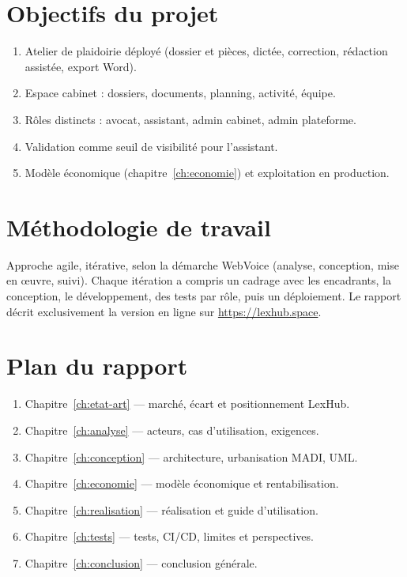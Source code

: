 \section{Objectifs du projet}

\begin{enumerate}[label=\textbf{O\arabic*.}]
  \item Atelier de plaidoirie déployé (dossier et pièces, dictée, correction, rédaction assistée, export Word).
  \item Espace cabinet : dossiers, documents, planning, activité, équipe.
  \item Rôles distincts : avocat, assistant, admin cabinet, admin plateforme.
  \item Validation comme seuil de visibilité pour l'assistant.
  \item Modèle économique (chapitre~\ref{ch:economie}) et exploitation en production.
\end{enumerate}

\section{Méthodologie de travail}

Approche agile, itérative, selon la démarche WebVoice (analyse, conception, mise en œuvre, suivi). Chaque itération a compris un cadrage avec les encadrants, la conception, le développement, des tests par rôle, puis un déploiement. Le rapport décrit exclusivement la version en ligne sur \url{https://lexhub.space}.

\section{Plan du rapport}

\begin{enumerate}[leftmargin=1.4em]
  \item Chapitre~\ref{ch:etat-art} --- marché, écart et positionnement LexHub.
  \item Chapitre~\ref{ch:analyse} --- acteurs, cas d'utilisation, exigences.
  \item Chapitre~\ref{ch:conception} --- architecture, urbanisation MADI, UML.
  \item Chapitre~\ref{ch:economie} --- modèle économique et rentabilisation.
  \item Chapitre~\ref{ch:realisation} --- réalisation et guide d'utilisation.
  \item Chapitre~\ref{ch:tests} --- tests, CI/CD, limites et perspectives.
  \item Chapitre~\ref{ch:conclusion} --- conclusion générale.
\end{enumerate}
